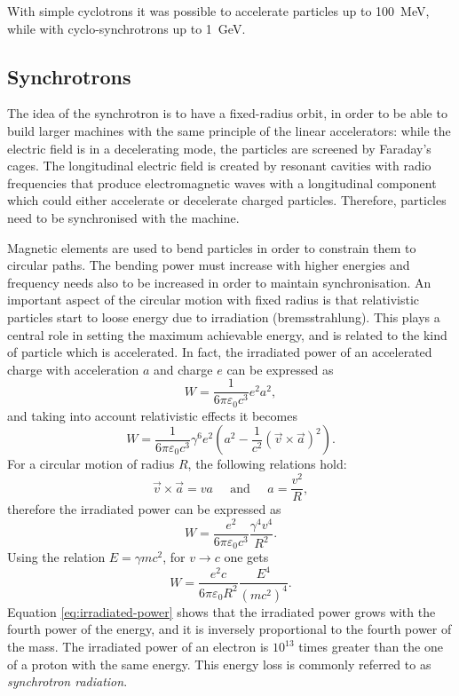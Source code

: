 With simple cyclotrons it was possible to accelerate particles up to \SI{100}{MeV}, while with cyclo-synchrotrons up to \SI{1}{GeV}.

\subsection{Synchrotrons}
The idea of the synchrotron is to have a fixed-radius orbit, in order to be able to build larger machines with the same principle of the linear accelerators: while the electric field is in a decelerating mode, the particles are screened by Faraday's cages. The longitudinal electric field is created by resonant cavities with radio frequencies that produce electromagnetic waves with a longitudinal component which could either accelerate or decelerate charged particles. Therefore, particles need to be synchronised with the machine.

Magnetic elements are used to bend particles in order to constrain them to circular paths. The bending power must increase with higher energies and frequency needs also to be increased in order to maintain synchronisation. An important aspect of the circular motion with fixed radius is that relativistic particles start to loose energy due to irradiation (bremsstrahlung). This plays a central role in setting the maximum achievable energy, and  is related to the kind of particle which is accelerated. In fact, the irradiated power of an accelerated charge with acceleration $a$ and charge $e$ can be expressed as
\begin{equation*}
    W = \frac{1}{6\pi\varepsilon_0c^3}e^2a^2,
\end{equation*}
and taking into account relativistic effects it becomes
\begin{equation*}
    W = \frac{1}{6\pi\varepsilon_0c^3}\gamma^6e^2\left(a^2-\frac{1}{c^2}(\Vec{v}\times\Vec{a})^2\right).
\end{equation*}
For a circular motion of radius $R$, the following relations hold:
\begin{equation*}
    \Vec{v}\times\Vec{a} = va \;\;\;\;\;\text{and}\;\;\;\;\; a = \frac{v^2}{R},
\end{equation*}
therefore the irradiated power can be expressed as 
\begin{equation*}
    W = \frac{e^2}{6\pi\varepsilon_0c^3}\frac{\gamma^4v^4}{R^2}.
\end{equation*}
Using the relation $E = \gamma mc^2$, for $v \rightarrow{c}$ one gets
\begin{equation}
    W = \frac{e^2c}{6\pi\varepsilon_0R^2}\frac{E^4}{(mc^2)^4}.
    \label{eq:irradiated-power}
\end{equation}
Equation \ref{eq:irradiated-power} shows that the irradiated power grows with the fourth power of the energy, and it is inversely proportional to the fourth power of the mass. The irradiated power of an electron is $10^{13}$ times greater than the one of a proton with the same energy.
This energy loss is commonly referred to as \emph{synchrotron radiation}.

